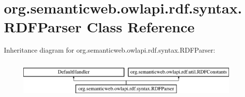 \hypertarget{classorg_1_1semanticweb_1_1owlapi_1_1rdf_1_1syntax_1_1_r_d_f_parser}{\section{org.\-semanticweb.\-owlapi.\-rdf.\-syntax.\-R\-D\-F\-Parser Class Reference}
\label{classorg_1_1semanticweb_1_1owlapi_1_1rdf_1_1syntax_1_1_r_d_f_parser}
}
Inheritance diagram for org.\-semanticweb.\-owlapi.\-rdf.\-syntax.\-R\-D\-F\-Parser\-:\begin{figure}[H]
\begin{center}
\leavevmode
\includegraphics[height=1.985816cm]{classorg_1_1semanticweb_1_1owlapi_1_1rdf_1_1syntax_1_1_r_d_f_parser}
\end{center}
\end{figure}
